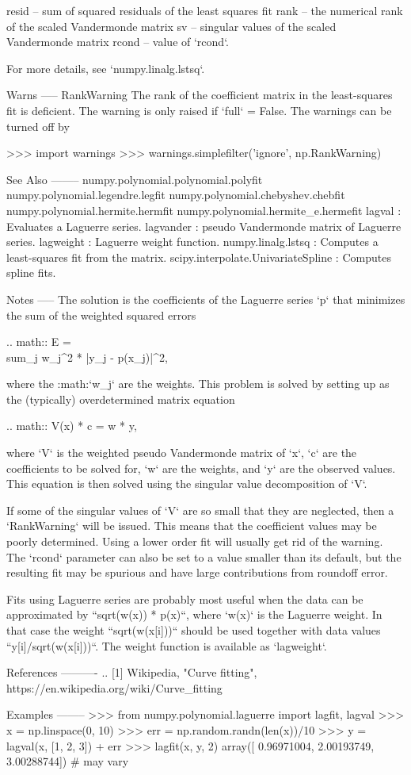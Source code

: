 \begin{DoxyVerb}
    resid -- sum of squared residuals of the least squares fit
    rank -- the numerical rank of the scaled Vandermonde matrix
    sv -- singular values of the scaled Vandermonde matrix
    rcond -- value of `rcond`.

    For more details, see `numpy.linalg.lstsq`.

Warns
-----
RankWarning
    The rank of the coefficient matrix in the least-squares fit is
    deficient. The warning is only raised if `full` = False.  The
    warnings can be turned off by

    >>> import warnings
    >>> warnings.simplefilter('ignore', np.RankWarning)

See Also
--------
numpy.polynomial.polynomial.polyfit
numpy.polynomial.legendre.legfit
numpy.polynomial.chebyshev.chebfit
numpy.polynomial.hermite.hermfit
numpy.polynomial.hermite_e.hermefit
lagval : Evaluates a Laguerre series.
lagvander : pseudo Vandermonde matrix of Laguerre series.
lagweight : Laguerre weight function.
numpy.linalg.lstsq : Computes a least-squares fit from the matrix.
scipy.interpolate.UnivariateSpline : Computes spline fits.

Notes
-----
The solution is the coefficients of the Laguerre series `p` that
minimizes the sum of the weighted squared errors

.. math:: E = \\sum_j w_j^2 * |y_j - p(x_j)|^2,

where the :math:`w_j` are the weights. This problem is solved by
setting up as the (typically) overdetermined matrix equation

.. math:: V(x) * c = w * y,

where `V` is the weighted pseudo Vandermonde matrix of `x`, `c` are the
coefficients to be solved for, `w` are the weights, and `y` are the
observed values.  This equation is then solved using the singular value
decomposition of `V`.

If some of the singular values of `V` are so small that they are
neglected, then a `RankWarning` will be issued. This means that the
coefficient values may be poorly determined. Using a lower order fit
will usually get rid of the warning.  The `rcond` parameter can also be
set to a value smaller than its default, but the resulting fit may be
spurious and have large contributions from roundoff error.

Fits using Laguerre series are probably most useful when the data can
be approximated by ``sqrt(w(x)) * p(x)``, where `w(x)` is the Laguerre
weight. In that case the weight ``sqrt(w(x[i]))`` should be used
together with data values ``y[i]/sqrt(w(x[i]))``. The weight function is
available as `lagweight`.

References
----------
.. [1] Wikipedia, "Curve fitting",
       https://en.wikipedia.org/wiki/Curve_fitting

Examples
--------
>>> from numpy.polynomial.laguerre import lagfit, lagval
>>> x = np.linspace(0, 10)
>>> err = np.random.randn(len(x))/10
>>> y = lagval(x, [1, 2, 3]) + err
>>> lagfit(x, y, 2)
array([ 0.96971004,  2.00193749,  3.00288744]) # may vary\end{DoxyVerb}
